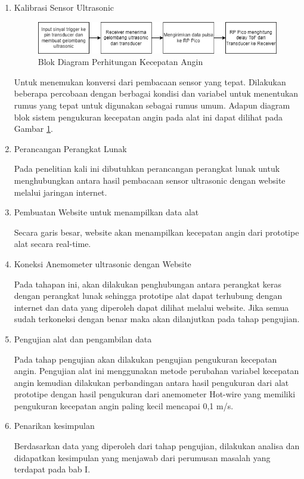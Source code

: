 \begin{enumerate}
  \item Kalibrasi Sensor Ultrasonic

\begin{figure}[h!]
	\centering
	\includegraphics[width=0.7\linewidth]{"gambar/Diagram blok pengukuran kecepatan angin.drawio"}
	\caption{Blok Diagram Perhitungan Kecepatan Angin}
	\label{fig:diagram-blok-pengukuran-kecepatan-angin}
\end{figure}

  Untuk menemukan konversi dari pembacaan sensor yang tepat. Dilakukan beberapa percobaan dengan berbagai kondisi dan variabel untuk menentukan rumus yang tepat untuk digunakan sebagai rumus umum.
  Adapun diagram blok sistem pengukuran kecepatan angin pada alat ini dapat dilihat pada Gambar \ref{fig:diagram-blok-pengukuran-kecepatan-angin}.

  \item Perancangan Perangkat Lunak
  
  Pada penelitian kali ini dibutuhkan perancangan perangkat lunak untuk menghubungkan antara hasil pembacaan sensor ultrasonic dengan website melalui jaringan internet.

  \item Pembuatan Website untuk menampilkan data alat
  
  Secara garis besar, website akan menampilkan kecepatan angin dari prototipe alat secara real-time.
  
  \item Koneksi Anemometer ultrasonic dengan Website
  
  Pada tahapan ini, akan dilakukan penghubungan antara perangkat keras dengan perangkat lunak sehingga prototipe alat dapat terhubung dengan internet dan data yang diperoleh dapat dilihat melalui 
  website. Jika semua sudah terkoneksi dengan benar maka akan dilanjutkan pada tahap pengujian.

  \item Pengujian alat dan pengambilan data
  
  Pada tahap pengujian akan dilakukan pengujian pengukuran kecepatan angin. Pengujian alat ini menggunakan metode perubahan variabel kecepatan angin kemudian dilakukan perbandingan 
  antara hasil pengukuran dari alat prototipe dengan hasil pengukuran dari anemometer Hot-wire yang
  memiliki pengukuran kecepatan angin paling kecil mencapai 0,1 m/s.
  \item Penarikan kesimpulan
  
  Berdasarkan data yang diperoleh dari tahap pengujian, dilakukan analisa dan didapatkan kesimpulan yang menjawab dari perumusan masalah yang terdapat pada bab I. 
\end{enumerate}

